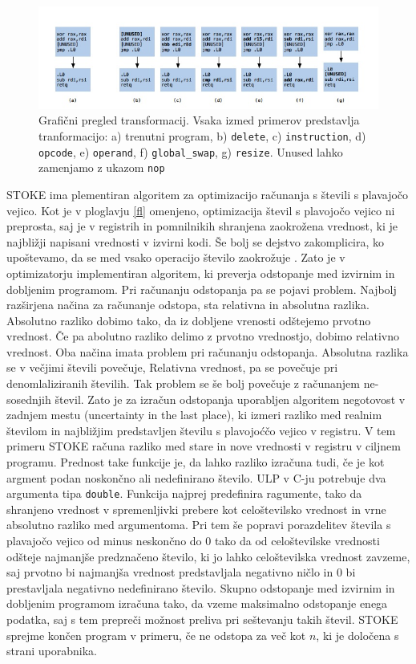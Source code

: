 \documentclass[a4paper, 12pt]{book}
\begin{document}
	\begin{figure}[htb]
		\begin{center}
			\includegraphics[width=13.5cm]{graf2.jpg}
		\end{center}
		\caption{Grafični pregled transformacij. Vsaka izmed primerov predstavlja tranformacijo: a) trenutni program, b) \texttt{delete}, c) \texttt{instruction}, d) \texttt{opcode}, e) \texttt{operand}, f) \texttt{global\_swap}, g) \texttt{resize}. Unused lahko zamenjamo z ukazom \texttt{nop}}
		\label{pic2}
	\end{figure}
	STOKE ima plementiran algoritem za optimizacijo računanja s števili s plavajočo vejico. Kot je v ploglavju \ref{fl} omenjeno, optimizacija števil s plavojočo vejico ni preprosta, saj je v registrih in pomnilnikih shranjena zaokrožena vrednost, ki je najbližji napisani vrednosti v izvirni kodi. Še bolj se dejstvo zakomplicira, ko upoštevamo, da se med vsako operacijo število zaokrožuje \cite{float2}. Zato je v optimizatorju implementiran algoritem, ki preverja odstopanje med izvirnim in dobljenim programom. Pri računanju odstopanja pa se pojavi problem. Najbolj razširjena načina za računanje odstopa, sta relativna in absolutna razlika. Absolutno razliko dobimo tako, da iz dobljene vrenosti odštejemo prvotno vrednost. Če pa abolutno razliko delimo z prvotno vrednostjo, dobimo relativno vrednost. Oba načina imata problem pri računanju odstopanja. Absolutna razlika se v večjimi števili povečuje, Relativna vrednost, pa se povečuje pri denomlaliziranih številih. Tak problem se še bolj povečuje z računanjem ne-sosednjih števil. Zato je za izračun odstopanja uporabljen algoritem negotovost v zadnjem mestu (uncertainty in the last place), ki izmeri razliko med realnim številom in najbližjim predstavljen številu s plavojoćčo vejico v registru. V tem primeru STOKE računa razliko med stare in nove vrednosti v registru v ciljnem programu. Prednost take funkcije je, da lahko razliko izračuna tudi, če je kot argment podan noskončno ali nedefinirano število. ULP v C-ju potrebuje dva argumenta tipa \texttt{double}. Funkcija najprej predefinira ragumente, tako da shranjeno vrednost v spremenljivki prebere kot celoštevilsko vrednost in vrne absolutno razliko med argumentoma. Pri tem še popravi porazdelitev števila s plavajočo vejico od minus neskončno do 0 tako da od celoštevilske vrednosti odšteje najmanjše predznačeno število, ki jo lahko celoštevilska vrednost zavzeme, saj prvotno bi najmanjša vrednost predstavljala negativno ničlo in 0 bi prestavljala negativno nedefinirano število. Skupno odstopanje med izvirnim in dobljenim programom izračuna tako, da vzeme maksimalno odstopanje enega podatka, saj s tem prepreči možnost preliva pri seštevanju takih števil. STOKE sprejme končen program v primeru, če ne odstopa za več kot \(n\), ki je določena s strani uporabnika.
	
\end{document}
